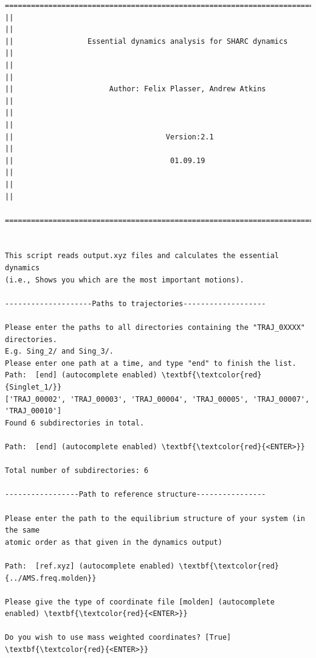 \documentclass[a4paper,11pt,DIV=15,openany]{scrbook}
\begin{document}
\begin{oframed}
\footnotesize\begin{Verbatim}[commandchars=\\\{\}]
  ================================================================================
||                                                                                ||
||                 Essential dynamics analysis for SHARC dynamics                 ||
||                                                                                ||
||                      Author: Felix Plasser, Andrew Atkins                      ||
||                                                                                ||
||                                   Version:2.1                                  ||
||                                    01.09.19                                    ||
||                                                                                ||
  ================================================================================


This script reads output.xyz files and calculates the essential dynamics 
(i.e., Shows you which are the most important motions).
  
--------------------Paths to trajectories-------------------

Please enter the paths to all directories containing the "TRAJ_0XXXX" directories.
E.g. Sing_2/ and Sing_3/. 
Please enter one path at a time, and type "end" to finish the list.
Path:  [end] (autocomplete enabled) \textbf{\textcolor{red}{Singlet_1/}}
['TRAJ_00002', 'TRAJ_00003', 'TRAJ_00004', 'TRAJ_00005', 'TRAJ_00007', 'TRAJ_00010']
Found 6 subdirectories in total.

Path:  [end] (autocomplete enabled) \textbf{\textcolor{red}{<ENTER>}}

Total number of subdirectories: 6

-----------------Path to reference structure----------------

Please enter the path to the equilibrium structure of your system (in the same
atomic order as that given in the dynamics output)

Path:  [ref.xyz] (autocomplete enabled) \textbf{\textcolor{red}{../AMS.freq.molden}}

Please give the type of coordinate file [molden] (autocomplete enabled) \textbf{\textcolor{red}{<ENTER>}}

Do you wish to use mass weighted coordinates? [True] \textbf{\textcolor{red}{<ENTER>}}


\end{Verbatim}
\end{oframed}
\end{document}
